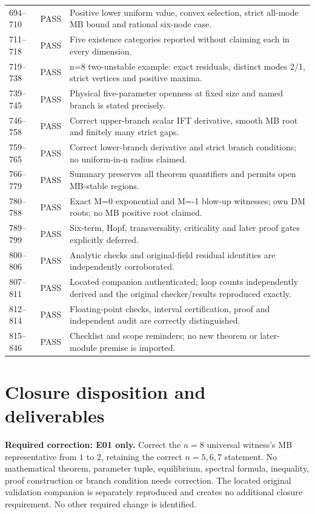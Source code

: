 \documentclass[11pt]{article}
\begin{document}
\begin{longtable}{@{}L{0.10\textwidth}L{0.17\textwidth}L{0.67\textwidth}@{}}
694--710 & PASS & Positive lower uniform value, convex selection, strict all-mode MB bound and rational six-node case.\\
711--718 & PASS & Five existence categories reported without claiming each in every dimension.\\
719--738 & PASS & n=8 two-unstable example: exact residuals, distinct modes 2/1, strict vertices and positive maxima.\\
739--745 & PASS & Physical five-parameter openness at fixed size and named branch is stated precisely.\\
746--758 & PASS & Correct upper-branch scalar IFT derivative, smooth MB root and finitely many strict gaps.\\
759--765 & PASS & Correct lower-branch derivative and strict branch conditions; no uniform-in-n radius claimed.\\
766--779 & PASS & Summary preserves all theorem quantifiers and permits open MB-stable regions.\\
780--788 & PASS & Exact M=0 exponential and M=-1 blow-up witnesses; own DM roots; no MB positive root claimed.\\
789--799 & PASS & Six-term, Hopf, transversality, criticality and later proof gates explicitly deferred.\\
800--806 & PASS & Analytic checks and original-field residual identities are independently corroborated.\\
807--811 & PASS & Located companion authenticated; loop counts independently derived and the original checker/results reproduced exactly.\\
812--814 & PASS & Floating-point checks, interval certification, proof and independent audit are correctly distinguished.\\
815--846 & PASS & Checklist and scope reminders; no new theorem or later-module premise is imported.\\
\bottomrule
\end{longtable}

\section{Closure disposition and deliverables}
\textbf{Required correction: E01 only.} Correct the $n=8$ universal
witness's MB representative from $1$ to $2$, retaining the correct
$n=5,6,7$ statement. No mathematical theorem, parameter tuple,
equilibrium, spectral formula, inequality, proof construction or
branch condition needs correction. The located original validation
companion is separately reproduced and creates no additional closure
requirement. No other required change is identified.
\end{document}
